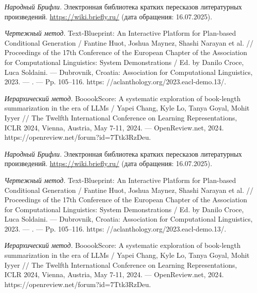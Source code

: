 \documentclass{article}
\theoremstyle{definition}
\theoremstyle{plain}
\begin{document}
\begin{thebibliography}{99}
\textit{Народный Брифли.}  
Электронная библиотека кратких пересказов литературных произведений.  
\url{https://wiki.briefly.ru/} (дата обращения: 16.07.2025).


\textit{Чертежный метод.}  
Text-Blueprint: An Interactive Platform for Plan-based Conditional Generation / Fantine Huot, Joshua Maynez, Shashi Narayan et al. // Proceedings of the 17th Conference of the European Chapter of the Association for Computational Linguistics:
System Demonstrations / Ed. by Danilo Croce, Luca Soldaini. — Dubrovnik, Croatia: Association for Computational Linguistics, 2023. — . — Pp. 105–116. https:
//aclanthology.org/2023.eacl-demo.13/.

\textit{Иерархический метод.}  
BooookScore: A systematic exploration of book-length summarization in the era of
LLMs / Yapei Chang, Kyle Lo, Tanya Goyal, Mohit Iyyer // The Twelfth International
Conference on Learning Representations, ICLR 2024, Vienna, Austria, May 7-11, 2024.
— OpenReview.net, 2024. https://openreview.net/forum?id=7Ttk3RzDeu.

\end{thebibliography}

\renewcommand\refname{References}


\begin{thebibliography}{99}
\textit{Народный Брифли.}  
Электронная библиотека кратких пересказов литературных произведений.  
\url{https://wiki.briefly.ru/} (дата обращения: 16.07.2025).

\textit{Чертежный метод.}  
Text-Blueprint: An Interactive Platform for Plan-based Conditional Generation / Fantine Huot, Joshua Maynez, Shashi Narayan et al. // Proceedings of the 17th Conference of the European Chapter of the Association for Computational Linguistics:
System Demonstrations / Ed. by Danilo Croce, Luca Soldaini. — Dubrovnik, Croatia: Association for Computational Linguistics, 2023. — . — Pp. 105–116. https:
//aclanthology.org/2023.eacl-demo.13/.

\textit{Иерархический метод.}  
BooookScore: A systematic exploration of book-length summarization in the era of
LLMs / Yapei Chang, Kyle Lo, Tanya Goyal, Mohit Iyyer // The Twelfth International
Conference on Learning Representations, ICLR 2024, Vienna, Austria, May 7-11, 2024.
— OpenReview.net, 2024. https://openreview.net/forum?id=7Ttk3RzDeu.

\end{thebibliography}
\end{document}
